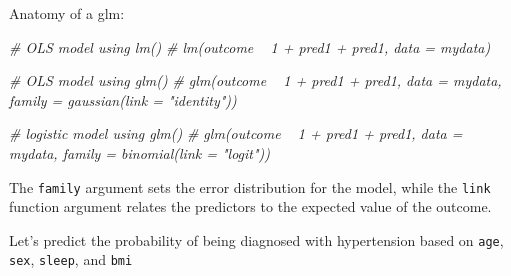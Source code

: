 \documentclass[]{book}
\newenvironment{Shaded}{\begin{snugshade}}{\end{snugshade}}
\newcommand{\CommentTok}[1]{\textcolor[rgb]{0.56,0.35,0.01}{\textit{#1}}}
\newcommand{\DataTypeTok}[1]{\textcolor[rgb]{0.13,0.29,0.53}{#1}}
\newcommand{\DecValTok}[1]{\textcolor[rgb]{0.00,0.00,0.81}{#1}}
\newcommand{\KeywordTok}[1]{\textcolor[rgb]{0.13,0.29,0.53}{\textbf{#1}}}
\newcommand{\NormalTok}[1]{#1}
\newcommand{\OperatorTok}[1]{\textcolor[rgb]{0.81,0.36,0.00}{\textbf{#1}}}
\newcommand{\StringTok}[1]{\textcolor[rgb]{0.31,0.60,0.02}{#1}}
\begin{document}
Anatomy of a glm:

\begin{Shaded}
\begin{Highlighting}[]
  \CommentTok{# OLS model using lm()}
  \CommentTok{# lm(outcome ~ 1 + pred1 + pred1, data = mydata)}

  \CommentTok{# OLS model using glm()}
  \CommentTok{# glm(outcome ~ 1 + pred1 + pred1, data = mydata, family = gaussian(link = "identity"))}
 
  \CommentTok{# logistic model using glm()}
  \CommentTok{# glm(outcome ~ 1 + pred1 + pred1, data = mydata, family = binomial(link = "logit"))}
\end{Highlighting}
\end{Shaded}

The \texttt{family} argument sets the error distribution for the model, while the \texttt{link} function
argument relates the predictors to the expected value of the outcome.

Let's predict the probability of being diagnosed with hypertension based on \texttt{age}, \texttt{sex}, \texttt{sleep}, and \texttt{bmi}

\begin{Shaded}
\end{Shaded}
\end{document}
